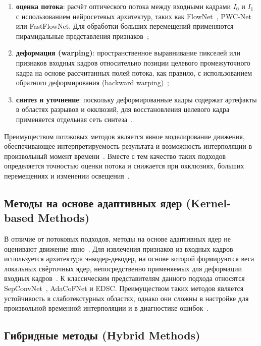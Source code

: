 \begin{enumerate}
	\item \textbf{оценка потока}: расчёт оптического потока между входными кадрами $I_0$ и $I_1$ с использованием нейросетевых архитектур, таких как FlowNet~\cite{ilg2017}, PWC-Net~\cite{sun2018} или FastFlowNet. Для обработки больших перемещений применяются пирамидальные представления признаков~\cite{sun2018};
	\item \textbf{деформация (warping)}: пространственное выравнивание пикселей или признаков входных кадров относительно позиции целевого промежуточного кадра на основе рассчитанных полей потока, как правило, с использованием обратного деформирования (backward warping)~\cite{jiang2018};
	\item \textbf{синтез и уточнение}: поскольку деформированные кадры содержат артефакты в областях разрывов и окклюзий, для восстановления целевого кадра применяется отдельная сеть синтеза~\cite{kye2026acevfi}.
\end{enumerate}

Преимуществом потоковых методов является явное моделирование движения, обеспечивающее интерпретируемость результата и возможность интерполяции в произвольный момент времени~\cite{huang2022}. Вместе с тем качество таких подходов определяется точностью оценки потока и снижается при окклюзиях, больших перемещениях и изменении освещения~\cite{IFRNet2022}.

\subsection*{Методы на основе адаптивных ядер (Kernel-based Methods)}

В отличие от потоковых подходов, методы на основе адаптивных ядер не оценивают движение явно~\cite{niklaus2017}. Для извлечения признаков из входных кадров используется архитектура энкодер-декодер, на основе которой формируются веса локальных свёрточных ядер, непосредственно применяемых для деформации входных кадров~\cite{niklaus2017}. К классическим представителям данного подхода относятся SepConvNet~\cite{niklaus2017}, AdaCoFNet и EDSC. Преимуществом таких методов является устойчивость в слаботекстурных областях, однако они сложны в настройке для произвольной временной интерполяции и в диагностике ошибок~\cite{kye2026acevfi}.

\subsection*{Гибридные методы (Hybrid Methods)}

